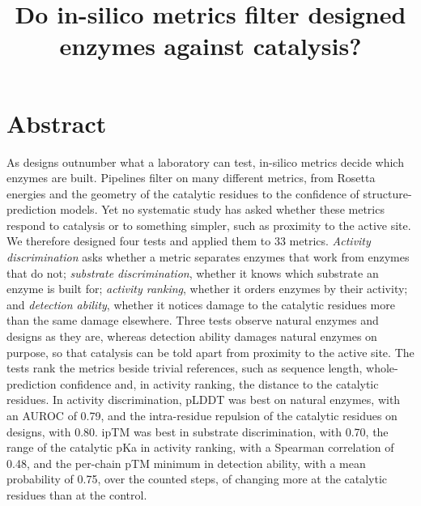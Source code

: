 \documentclass[
  10pt,
]{article}
\title{Do in-silico
metrics filter
designed enzymes
against catalysis?}
\author{}
\date{}
\DeclareRobustCommand{\_}{\textunderscore\hspace{0pt}}
\begin{document}
\maketitle

\nocite{listov2026,
  butcher2025,
  kim2026,
  listov2025,
  richter2011,
  abramson2024,
  lauko2025,
  ahern2026,
  watson2023,
  yeh2023,
  braun2026,
  jumper2021,
  chai2024,
  anishchenko2025,
  johnson2025,
  overath2025,
  garcia2026,
  korbeld2026,
  kiss2010,
  alford2017,
  chaudhury2010,
  lee1971,
  mitternacht2016,
  tien2013,
  olsson2011,
  sondergaard2011,
  evans2021,
  burley2025,
  berman2000,
  uniprot2023,
  dana2019,
  ribeiro2018,
  hanley1982,
  mann1947,
  efron1979,
  field2007,
  westfall1993,
  carlin2016,
  carlin2017,
  henikoff1992,
  spearman1904}

\section*{Abstract}

As designs outnumber
what a laboratory
can test, in-silico
metrics decide which
enzymes are built.
Pipelines filter on
many different
metrics, from
Rosetta energies and
the geometry of the
catalytic residues
to the confidence of
structure-prediction
models. Yet no
systematic study has
asked whether these
metrics respond to
catalysis or to
something simpler,
such as proximity to
the active site. We
therefore designed
four tests and
applied them to 33
metrics.
\emph{Activity
discrimination} asks
whether a metric
separates enzymes
that work from
enzymes that do not;
\emph{substrate
discrimination},
whether it knows
which substrate an
enzyme is built for;
\emph{activity
ranking}, whether it
orders enzymes by
their activity; and
\emph{detection
ability}, whether it
notices damage to
the catalytic
residues more than
the same damage
elsewhere. Three
tests observe
natural enzymes and
designs as they are,
whereas detection
ability damages
natural enzymes on
purpose, so that
catalysis can be
told apart from
proximity to the
active site. The
tests rank the
metrics beside
trivial references,
such as sequence
length,
whole-prediction
confidence and, in
activity ranking,
the distance to the
catalytic residues.
In activity
discrimination,
pLDDT was best on
natural enzymes,
with an AUROC of
0.79, and the
intra-residue
repulsion of the
catalytic residues
on designs, with
0.80. ipTM was best
in substrate
discrimination, with
0.70, the range of
the catalytic pKa in
activity ranking,
with a Spearman
correlation of 0.48,
and the per-chain
pTM minimum in
detection ability,
with a mean
probability of 0.75,
over the counted
steps, of changing
more at the
catalytic residues
than at the control.
\end{document}
